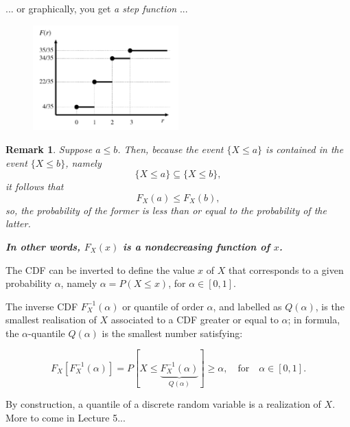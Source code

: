 \documentclass[smaller, handout]{beamer}\usepackage[]{graphicx}\usepackage[]{color}
\newtheorem{remark}{Remark}[section]
\begin{document}
\begin{frame}{\secname}
  \begin{example}[continued]
  ... or graphically, you get \textit{a step function} ...
  \begin{figure}[h!]
  \centering
  \includegraphics[width=0.5\textwidth,height=0.5\textheight]{img/repartbis.pdf}
  \end{figure}
  \end{example}
\end{frame}



\begin{frame}{\secname}
  \begin{remark}
  Suppose $a\leq b$. Then, because the event $\{X\leq a \}$ is contained in the
  event $\{X\leq b \}$, namely
  $$
  \{X\leq a \} \subseteq \{X\leq b \},
  $$
   it follows that
   $$F_X(a) \leq F_X(b),
   $$
  so, the probability of the former is less than or equal to the probability
  of the latter. \\
  \vspace{0.5cm}
  \begin{center}
  \textbf{In other words, $F_X(x)$ is a nondecreasing function of $x$.}
  \end{center}
  \end{remark}
\end{frame}

\begin{frame}{\secname}
  \begin{example} [Quantiles]

  The CDF can be inverted to define the value $x$ of $X$ that corresponds to a given probability $\alpha$, namely $\alpha = P (X \leq x )$, for $\alpha \in [0,1]$. \\ \vspace{0.4cm}

  The inverse CDF $F_X^{-1}(\alpha)$ or quantile of order $\alpha$, and labelled as  $Q(\alpha)$, is the smallest
  realisation of $X$ associated to a CDF greater or equal to $\alpha$; in formula, the
  $\alpha$-quantile $Q(\alpha)$ is the smallest number satisfying:

  $$
  F_X [F^{-1}_X (\alpha)] = P[X \leq \underbrace{F^{-1}_X (\alpha)}_{Q(\alpha)}] \geq \alpha, \quad \text{for} \quad \alpha\in[0,1].
  $$

  By construction, a quantile of a discrete random variable is a realization of $X$. More to come in Lecture 5...
  \end{example}
\end{frame}
\end{document}

